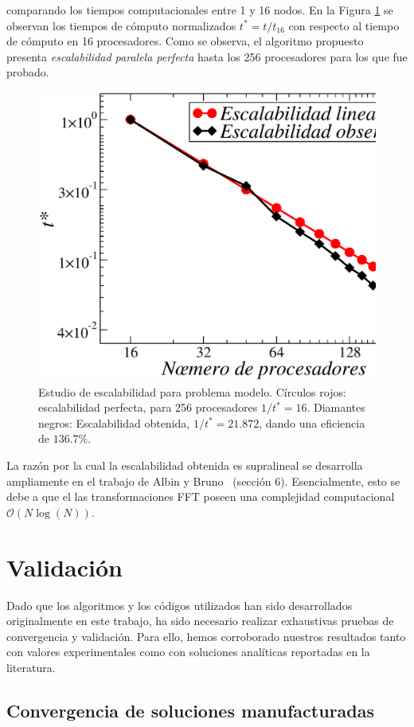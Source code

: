 comparando los tiempos computacionales entre 1 y 16 nodos. 
En la Figura \ref{fig:scala} se observan los tiempos de cómputo 
normalizados $t^*=t/t_{16}$ con respecto al tiempo de cómputo 
en 16 procesadores. 
Como se observa, el algoritmo 
propuesto presenta \textit{escalabilidad paralela perfecta} 
hasta los 256 procesadores para los que fue probado. 
\begin{figure}[h!]
\centering
  \includegraphics[width=0.5\linewidth]{figuras/escalabilidad.eps}
  \caption{Estudio de escalabilidad para problema modelo. 
  Círculos rojos: escalabilidad perfecta, para 256 procesadores $1/t^*=16$. 
  Diamantes negros: Escalabilidad obtenida, $1/t^*=21.872$, dando 
 una eficiencia de $136.7\%$.}
 \label{fig:scala}
\end{figure}

La razón por la cual la escalabilidad obtenida es supralineal se 
desarrolla ampliamente en el trabajo de Albin y Bruno~\cite{Albin2011}
(sección 6). Esencialmente, esto se debe a que el 
las transformaciones FFT 
poseen una complejidad computacional $\mathcal{O}(N\log(N))$.

\section{Validación}

Dado que los algoritmos y los códigos utilizados han sido desarrollados 
originalmente en este trabajo, ha sido necesario realizar exhaustivas 
pruebas de convergencia y validación. Para ello, 
hemos corroborado nuestros resultados tanto con valores experimentales 
como con soluciones analíticas reportadas en la literatura.

\subsection{Convergencia de soluciones manufacturadas}
\label{sec:manufacturada}

